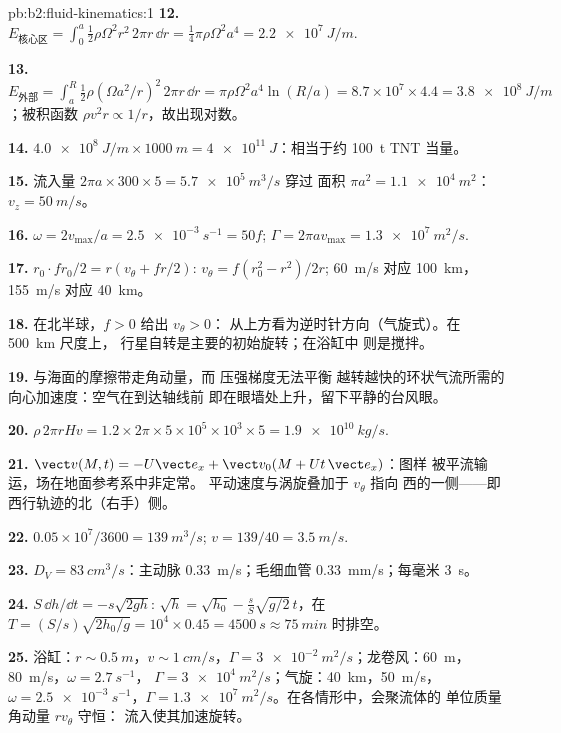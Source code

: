 \begin{solution}{pb:b2:fluid-kinematics:1}
\textbf{12.} $E_{\text{核心区}} = \int_0^a\tfrac12\rho\Omega^2r^2\,2\pi r\,\dd r =
\tfrac14\pi\rho\Omega^2a^4 = \qty{2.2e7}{J/m}$.

\textbf{13.} $E_{\text{外部}} = \int_a^R\tfrac12\rho(\Omega a^2/r)^2\,2\pi r\,\dd r =
\pi\rho\Omega^2a^4\ln(R/a) = 8.7 \times 10^7 \times 4.4 = \qty{3.8e8}{J/m}$；被积函数
$\rho v^2r \propto 1/r$，故出现对数。

\textbf{14.} $\qty{4.0e8}{J/m} \times \qty{1000}{m} = \qty{4e11}{J}$：相当于约
\qty{100}{t} TNT 当量。

\textbf{15.} 流入量 $2\pi a \times 300 \times 5 = \qty{5.7e5}{m^3/s}$ 穿过
面积 $\pi a^2 = \qty{1.1e4}{m^2}$：$v_z = \qty{50}{m/s}$。

\textbf{16.} $\omega = 2v_{\max}/a = \qty{2.5e-3}{s^{-1}} = 50f$; $\Gamma = 2\pi av_{\max}
= \qty{1.3e7}{m^2/s}$.

\textbf{17.} $r_0\cdot fr_0/2 = r(v_\theta + fr/2)$: $v_\theta = f(r_0^2 - r^2)/2r$;
\qty{60}{m/s} 对应 \qty{100}{km}，\qty{155}{m/s} 对应 \qty{40}{km}。

\textbf{18.} 在北半球，$f > 0$ 给出 $v_\theta > 0$：
从上方看为逆时针方向（气旋式）。在 \qty{500}{km} 尺度上，
行星自转是主要的初始旋转；在浴缸中
则是搅拌。

\textbf{19.} 与海面的摩擦带走角动量，而
压强梯度无法平衡
越转越快的环状气流所需的向心加速度：空气在到达轴线前
即在眼墙处上升，留下平静的台风眼。

\textbf{20.} $\rho\,2\pi rHv = 1.2 \times 2\pi \times 5 \times 10^5 \times 10^3 \times 5 =
\qty{1.9e10}{kg/s}$.

\textbf{21.} $\vect v(M, t) = -U\vect e_x + \vect v_0(M + Ut\,\vect e_x)$：图样
被平流输运，场在地面参考系中非定常。
平动速度与涡旋叠加于 $v_\theta$ 指向
西的一侧——即西行轨迹的北（右手）侧。

\textbf{22.} $0.05 \times 10^7/3600 = \qty{139}{m^3/s}$; $v = 139/40 = \qty{3.5}{m/s}$.

\textbf{23.} $D_V = \qty{83}{cm^3/s}$：主动脉 \qty{0.33}{m/s}；毛细血管
\qty{0.33}{mm/s}；每毫米 \qty{3}{s}。

\textbf{24.} $S\,\dd h/\dd t = -s\sqrt{2gh}$: $\sqrt h = \sqrt{h_0} -
\frac sS\sqrt{g/2}\,t$，在 $T = (S/s)\sqrt{2h_0/g} = 10^4 \times 0.45 =
\qty{4500}{s} \approx \qty{75}{min}$ 时排空。

\textbf{25.} 浴缸：$r \sim \qty{0.5}{m}$，$v \sim \qty{1}{cm/s}$，$\Gamma =
\qty{3e-2}{m^2/s}$；龙卷风：\qty{60}{m}，\qty{80}{m/s}，$\omega = \qty{2.7}{s^{-1}}$，
$\Gamma = \qty{3e4}{m^2/s}$；气旋：\qty{40}{km}，\qty{50}{m/s}，$\omega =
\qty{2.5e-3}{s^{-1}}$，$\Gamma = \qty{1.3e7}{m^2/s}$。在各情形中，会聚流体的
单位质量角动量 $rv_\theta$ 守恒：
流入使其加速旋转。
\end{solution}
